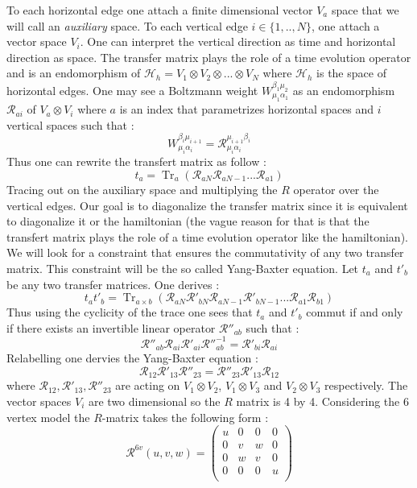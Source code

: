 \documentclass{article}
\DeclareMathOperator{\tr}{Tr}
\theoremstyle{definition}
\begin{document}
To each horizontal edge one attach a finite dimensional vector $V_{a}$ space that we will call an \textit{auxiliary} space. To each vertical edge $i\in\{1,..,N\}$, one attach a vector space $V_{i}$. One can interpret the vertical direction as time and horizontal direction as space. The transfer matrix plays the role of a time evolution operator and is an endomorphism of $\mathcal{H}_{h}=V_{1}\otimes V_{2}\otimes...\otimes V_{N}$ where $\mathcal{H}_{h}$ is the space of horizontal edges. One may see a Boltzmann weight $ W_{\mu_{1}\alpha_{1}}^{\beta_1\mu_2}$ as an endomorphism $\mathcal{R}_{ai}$ of  $V_{a}\otimes V_{i}$ where $a$ is an index that parametrizes horizontal spaces and $i$ vertical spaces such that : $$W_{\mu_{i}\alpha_{i}}^{\beta_i\mu_{i+1}}=\mathcal{R}_{\mu_{i}\alpha_{i}}^{\mu_{i+1}\beta_{i}}$$ Thus one can rewrite the transfert matrix as follow : $$ t_{a}=\tr_{a}\left(\mathcal{R}_{aN}\mathcal{R}_{aN-1}...\mathcal{R}_{a1}\right)$$ Tracing out on the auxiliary space and multiplying  the $R$ operator over the vertical edges. Our goal is to diagonalize the transfer matrix since it is equivalent to diagonalize it or the hamiltonian (the vague reason for that is that the transfert matrix plays the role of a time evolution operator like the hamiltonian). We will look for a constraint that ensures the commutativity of any two transfer matrix. This constraint will be the so called Yang-Baxter equation. Let $t_{a}$ and $t'_{b}$ be any two transfer matrices. One derives : $$t_{a}t'_{b}=\tr_{a\times b}\left(\mathcal{R}_{aN}\mathcal{R}'_{bN}\mathcal{R}_{aN-1}\mathcal{R}'_{bN-1}...\mathcal{R}_{a1}\mathcal{R}_{b1}\right)$$ Thus using the cyclicity of the trace one sees that $t_{a}$ and $t'_{b}$ commut if and only if there exists an invertible linear operator $\mathcal{R}''_{ab}$ such that : $$\mathcal{R}''_{ab}\mathcal{R}_{ai}\mathcal{R}'_{ai}\mathcal{R}''^{-1}_{ab}=\mathcal{R}'_{bi}\mathcal{R}_{ai}$$ Relabelling one dervies the Yang-Baxter equation : $$\mathcal{R}_{12}\mathcal{R}'_{13}\mathcal{R}''_{23}=\mathcal{R}''_{23}\mathcal{R}'_{13}\mathcal{R}_{12}$$ where $\mathcal{R}_{12},\mathcal{R}'_{13}, \mathcal{R}''_{23}$ are acting on $V_{1}\otimes V_{2}$, $V_{1}\otimes V_{3}$ and $V_{2}\otimes V_{3}$ respectively. The vector spaces $V_{i}$ are two dimensional so the $R$ matrix is 4 by 4. Considering the 6 vertex model the $R$-matrix takes the following form : $$\mathcal{R}^{6v}(u,v,w)=
  \left( {\begin{array}{cccc}
   u & 0 & 0 & 0 \\
   0 & v & w & 0 \\
   0 & w & v & 0 \\
   0 & 0 & 0 & u \\
  \end{array} } \right) $$ 
\end{document}
